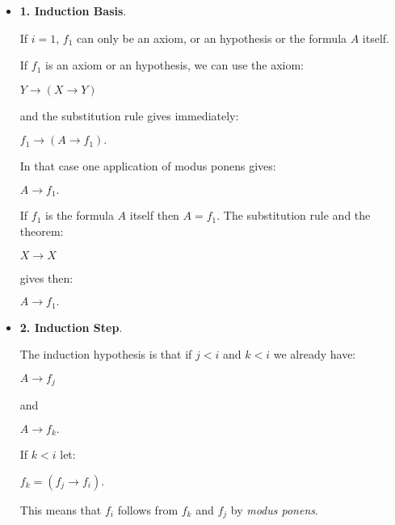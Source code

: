\documentclass[12pt]{article}
\begin{document}
\begin{itemize}
\item \textbf{1. Induction Basis}.

If $i = 1$, $f_1$ can only be an axiom, or an hypothesis or the formula $A$ itself.

If $f_1$ is an axiom or an hypothesis, we can use the axiom:

\begin{center}
$Y \rightarrow (X \rightarrow Y)$
\end{center}

and the substitution rule gives immediately:

\begin{center}
$f_1 \rightarrow (A \rightarrow f_1).$
\end{center}

In that case one application of modus ponens gives:

\begin{center}
$A \rightarrow f_1.$
\end{center}

If $f_1$ is the formula $A$ itself then $A = f_1$. The substitution rule and the theorem:

\begin{center}
$X \rightarrow X$
\end{center}
 
gives then:

\begin{center}
$A \rightarrow f_1.$
\end{center}

\item \textbf{2. Induction Step}.

The induction hypothesis is that if $j < i$ and $k < i$ we already have:

\begin{center}
$A \rightarrow f_j$
\end{center}

and

\begin{center}
$A \rightarrow f_k.$
\end{center}
                      
If $k < i$ let:

\begin{center}
$f_k = (f_j \rightarrow f_i).$
\end{center}

This means that $f_i$ follows from $f_k$ and $f_j$ by \emph{modus ponens}.


\end{itemize}
\end{document}
